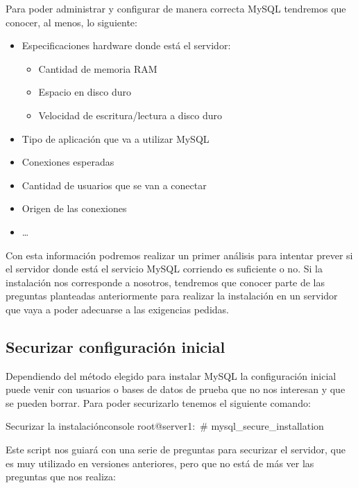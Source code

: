 Para poder administrar y configurar de manera correcta MySQL tendremos que conocer, al menos, lo siguiente:

\begin{itemize}
    \item Especificaciones hardware donde está el servidor:
    \begin{itemize}
        \item Cantidad de memoria RAM
        \item Espacio en disco duro
        \item Velocidad de escritura/lectura a disco duro
    \end{itemize}
    \item Tipo de aplicación que va a utilizar MySQL
    \item Conexiones esperadas
    \item Cantidad de usuarios que se van a conectar
    \item Origen de las conexiones
    \item …
\end{itemize}

Con esta información podremos realizar un primer análisis para intentar prever si el servidor donde está el servicio MySQL corriendo es suficiente o no. Si la instalación nos corresponde a nosotros, tendremos que conocer parte de las preguntas planteadas anteriormente para realizar la instalación en un servidor que vaya a poder adecuarse a las exigencias pedidas.


\hypertarget{securizar_configuracion_inicial}{}
\subsection{Securizar configuración inicial}
Dependiendo del método elegido para instalar MySQL la configuración inicial puede venir con usuarios o bases de datos de prueba que no nos interesan y que se pueden borrar. Para poder securizarlo tenemos el siguiente comando:

\begin{mycode}{Securizar la instalación}{console}{}
root@server1:~# mysql_secure_installation
\end{mycode}

Este script nos guiará con una serie de preguntas para securizar el servidor, que es muy utilizado en versiones anteriores, pero que no está de más ver las preguntas que nos realiza:


